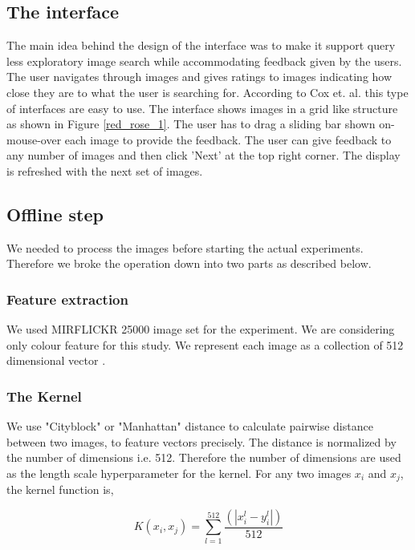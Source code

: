 \documentclass[english]{tktltiki}
\begin{document}
\subsection{The interface}

The main idea behind the design of the interface was to make it support query less exploratory image search while accommodating feedback given by the users. The user navigates through images and gives ratings to images indicating how close they are to what the user is searching for. According to Cox et. al. \cite{pichunter} this type of interfaces are easy to use. The interface shows images in a grid like structure as shown in Figure \ref{red_rose_1}. The user has to drag a sliding bar shown on-mouse-over each image to provide the feedback. The user can give feedback to any number of images and then click 'Next' at the top right corner. The display is refreshed with the next set of images.


\subsection{Offline step}

We needed to process the images before starting the actual experiments. Therefore we broke the operation down into two parts as described below.

\subsubsection{Feature extraction}

We used MIRFLICKR 25000 \cite{mirflickr} image set for the experiment. We are considering only colour feature for this study. We represent each image as a collection of 512 dimensional vector \cite{imse}.

\subsubsection{The Kernel}

We use "Cityblock" or "Manhattan" distance to calculate pairwise distance between two images, to feature vectors precisely. The distance is normalized by the number of dimensions i.e. 512. Therefore the number of dimensions are used as the length scale hyperparameter for the kernel. For any two images $x_i$ and $x_j$, the kernel function is,

\begin{equation}
K(x_i, x_j) = \sum_{l = 1}^{512}\frac{(|x_i^l - y_i^l|)} {512}
\end{equation}
\end{document}
